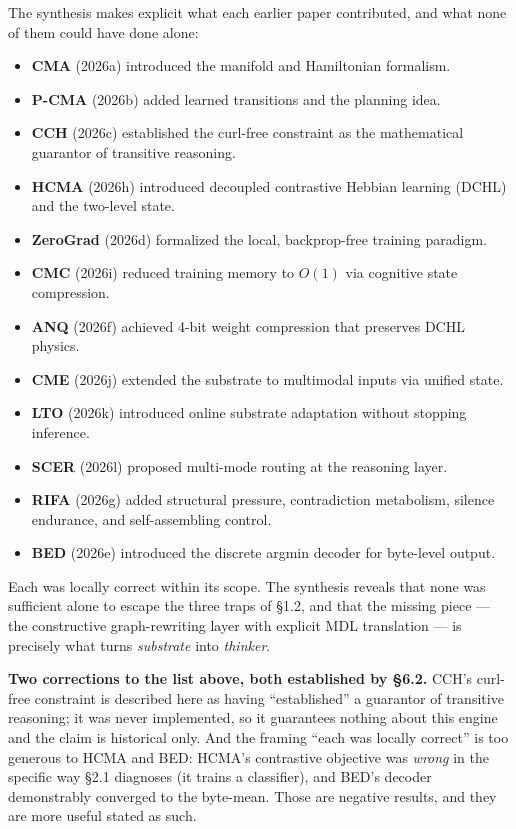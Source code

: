 \documentclass[
  11pt,
  a4paper,
]{article}
\providecommand{\tightlist}{%
  \setlength{\itemsep}{0pt}\setlength{\parskip}{0pt}}
\begin{document}
The synthesis makes explicit what each earlier paper contributed, and
what none of them could have done alone:

\begin{itemize}
\tightlist
\item
  \textbf{CMA} (2026a) introduced the manifold and Hamiltonian
  formalism.
\item
  \textbf{P-CMA} (2026b) added learned transitions and the planning
  idea.
\item
  \textbf{CCH} (2026c) established the curl-free constraint as the
  mathematical guarantor of transitive reasoning.
\item
  \textbf{HCMA} (2026h) introduced decoupled contrastive Hebbian
  learning (DCHL) and the two-level state.
\item
  \textbf{ZeroGrad} (2026d) formalized the local, backprop-free training
  paradigm.
\item
  \textbf{CMC} (2026i) reduced training memory to \(O(1)\) via cognitive
  state compression.
\item
  \textbf{ANQ} (2026f) achieved 4-bit weight compression that preserves
  DCHL physics.
\item
  \textbf{CME} (2026j) extended the substrate to multimodal inputs via
  unified state.
\item
  \textbf{LTO} (2026k) introduced online substrate adaptation without
  stopping inference.
\item
  \textbf{SCER} (2026l) proposed multi-mode routing at the reasoning
  layer.
\item
  \textbf{RIFA} (2026g) added structural pressure, contradiction
  metabolism, silence endurance, and self-assembling control.
\item
  \textbf{BED} (2026e) introduced the discrete argmin decoder for
  byte-level output.
\end{itemize}

Each was locally correct within its scope. The synthesis reveals that
none was sufficient alone to escape the three traps of §1.2, and that
the missing piece --- the constructive graph-rewriting layer with
explicit MDL translation --- is precisely what turns \emph{substrate}
into \emph{thinker}.

\textbf{Two corrections to the list above, both established by §6.2.}
CCH's curl-free constraint is described here as having ``established'' a
guarantor of transitive reasoning; it was never implemented, so it
guarantees nothing about this engine and the claim is historical only.
And the framing ``each was locally correct'' is too generous to HCMA and
BED: HCMA's contrastive objective was \emph{wrong} in the specific way
§2.1 diagnoses (it trains a classifier), and BED's decoder demonstrably
converged to the byte-mean. Those are negative results, and they are
more useful stated as such.
\end{document}
